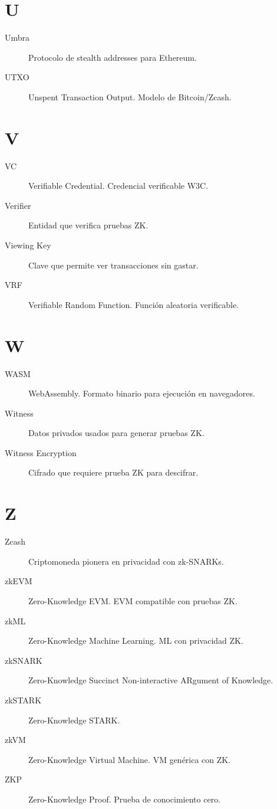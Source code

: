 \documentclass[11pt,a4paper,twoside]{book}
\theoremstyle{definition}
\theoremstyle{remark}
\begin{document}
\section*{U}
\begin{description}
\item[Umbra] Protocolo de stealth addresses para Ethereum.
\item[UTXO] Unspent Transaction Output. Modelo de Bitcoin/Zcash.
\end{description}

\section*{V}
\begin{description}
\item[VC] Verifiable Credential. Credencial verificable W3C.
\item[Verifier] Entidad que verifica pruebas ZK.
\item[Viewing Key] Clave que permite ver transacciones sin gastar.
\item[VRF] Verifiable Random Function. Función aleatoria verificable.
\end{description}

\section*{W}
\begin{description}
\item[WASM] WebAssembly. Formato binario para ejecución en navegadores.
\item[Witness] Datos privados usados para generar pruebas ZK.
\item[Witness Encryption] Cifrado que requiere prueba ZK para descifrar.
\end{description}

\section*{Z}
\begin{description}
\item[Zcash] Criptomoneda pionera en privacidad con zk-SNARKs.
\item[zkEVM] Zero-Knowledge EVM. EVM compatible con pruebas ZK.
\item[zkML] Zero-Knowledge Machine Learning. ML con privacidad ZK.
\item[zkSNARK] Zero-Knowledge Succinct Non-interactive ARgument of Knowledge.
\item[zkSTARK] Zero-Knowledge STARK.
\item[zkVM] Zero-Knowledge Virtual Machine. VM genérica con ZK.
\item[ZKP] Zero-Knowledge Proof. Prueba de conocimiento cero.
\end{description}
\end{document}
